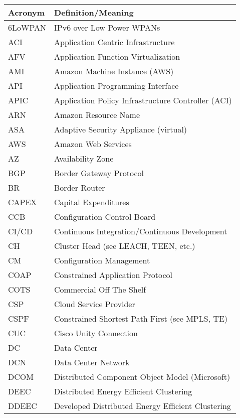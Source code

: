 \begin{longtable}{ll}
  \toprule
  \textbf{Acronym}	&	\textbf{Definition/Meaning}		\\ \midrule
  6LoWPAN	&		IPv6 over Low Power WPANs		\\ \midrule
  ACI		&		Application Centric Infrastructure		\\ \midrule
  AFV		&		Application Function Virtualization		\\ \midrule
  AMI		&		Amazon Machine Instance (AWS)		\\ \midrule
  API		&		Application Programming Interface		\\ \midrule
  APIC		&		Application Policy Infrastructure Controller (ACI)		\\ \midrule
  ARN		&		Amazon Resource Name		\\ \midrule
  ASA		&		Adaptive Security Appliance (virtual)		\\ \midrule
  AWS		&		Amazon Web Services		\\ \midrule
  AZ		&		Availability Zone		\\ \midrule
  BGP		&		Border Gateway Protocol		\\ \midrule
  BR		&		Border Router		\\ \midrule
  CAPEX		&		Capital Expenditures		\\ \midrule
  CCB		&		Configuration Control Board		\\ \midrule
  CI/CD		&		Continuous Integration/Continuous Development		\\ \midrule
  CH		&		Cluster Head (see LEACH, TEEN, etc.)		\\ \midrule
  CM		&		Configuration Management		\\ \midrule
  COAP		&		Constrained Application Protocol		\\ \midrule
  COTS		&		Commercial Off The Shelf		\\ \midrule
  CSP		&		Cloud Service Provider		\\ \midrule
  CSPF		&		Constrained Shortest Path First (see MPLS, TE)		\\ \midrule
  CUC		&		Cisco Unity Connection		\\ \midrule
  DC		&		Data Center		\\ \midrule
  DCN		&		Data Center Network		\\ \midrule
  DCOM		&		Distributed Component Object Model (Microsoft)		\\ \midrule
  DEEC		&		Distributed Energy Efficient Clustering		\\ \midrule
  DDEEC		&		Developed Distributed Energy Efficient Clustering		\\ \midrule

\end{longtable}

